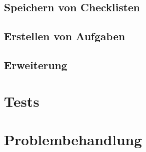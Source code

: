 \subsection{Speichern von Checklisten}\label{subsec:speichereCheckliste}

\subsection{Erstellen von Aufgaben}\label{subsec:erstelleAufgaben}

\subsection{Erweiterung}\label{subsec:erweiterung}

\section{Tests}\label{sec:tests}

\section{Problembehandlung}\label{sec:problem}